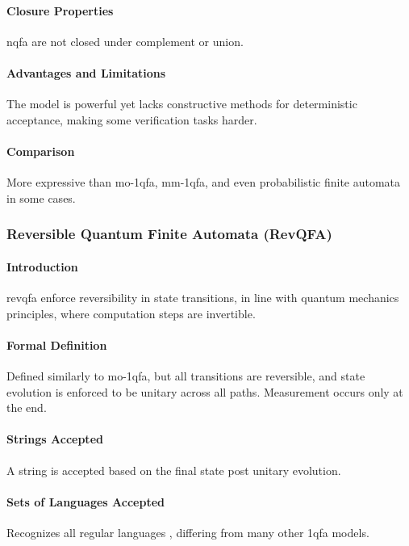 \paragraph{Closure Properties}
\gls{nqfa} are not closed under complement or union.

\paragraph{Advantages and Limitations}
The model is powerful yet lacks constructive methods for deterministic acceptance, making some verification tasks harder.

\paragraph{Comparison}
More expressive than \gls{mo-1qfa}, \gls{mm-1qfa}, and even probabilistic finite automata in some cases.

\subsubsection{Reversible Quantum Finite Automata (RevQFA)}
\paragraph{Introduction}
\gls{revqfa} enforce reversibility in state transitions, in line with quantum mechanics principles, where computation steps are invertible.

\paragraph{Formal Definition}
Defined similarly to \gls{mo-1qfa}, but all transitions are reversible, and state evolution is enforced to be unitary across all paths. Measurement occurs only at the end.

\paragraph{Strings Accepted}
A string is accepted based on the final state post unitary evolution.

\paragraph{Sets of Languages Accepted}
Recognizes all regular languages \cite{yamakami2014one}, differing from many other \gls{1qfa} models.

